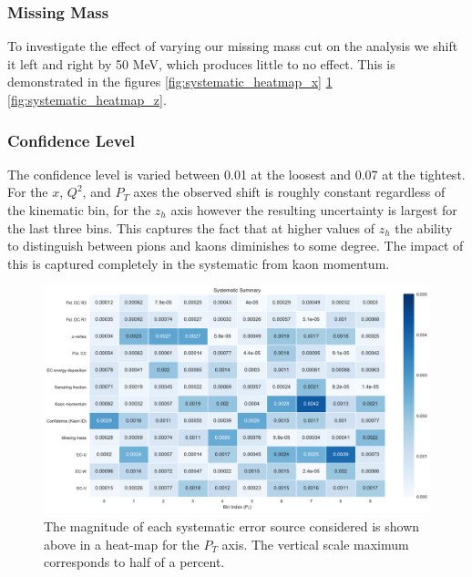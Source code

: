 \subsubsection*{Missing Mass}
To investigate the effect of varying our missing mass cut on the analysis we shift it left and right by 50 MeV, which produces little to no effect.  This is demonstrated in the figures \ref{fig:systematic_heatmap_x} \ref{fig:systematic_heatmap_pt} \ref{fig:systematic_heatmap_z}.

\subsubsection*{Confidence Level}
The confidence level is varied between 0.01 at the loosest and 0.07 at the tightest.  For the $x$, $Q^2$, and $P_T$ axes the observed shift is roughly constant regardless of the kinematic bin, for the $z_h$ axis however the resulting uncertainty is largest for the last three bins.  This captures the fact that at higher values of $z_h$ the ability to distinguish between pions and kaons diminishes to some degree.  The impact of this is captured completely in the systematic from kaon momentum. 

\begin{figure}
	\label{fig:systematic_heatmap_pt}
	\begin{center}
		\includegraphics[width=14cm]{image/plots/kaon-bsa/systematics_integrated_heatmap_pt.pdf}
		\caption{The magnitude of each systematic error source considered is shown above in a heat-map for the $P_T$ axis.  The vertical scale maximum corresponds to half of a percent.}
	\end{center}
\end{figure}

